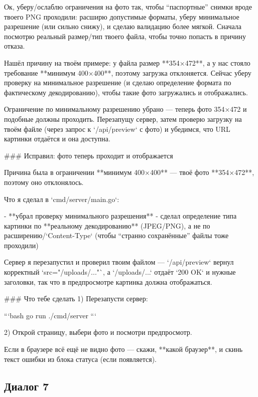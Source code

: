 \documentclass[a4paper, 14pt]{extarticle} %
\begin{document}
\begin{AnswerBlock}

Ок, уберу/ослаблю ограничения на фото так, чтобы “паспортные” снимки вроде твоего PNG проходили: расширю допустимые форматы, уберу минимальное разрешение (или сильно снижу), и сделаю валидацию более мягкой. Сначала посмотрю реальный размер/тип твоего файла, чтобы точно попасть в причину отказа.

Нашёл причину на твоём примере: у файла размер **354×472**, а у нас стояло требование **минимум 400×400**, поэтому загрузка отклоняется. Сейчас уберу проверку на минимальное разрешение (и сделаю определение формата по фактическому декодированию), чтобы такие фото загружались и отображались.

Ограничение по минимальному разрешению убрано — теперь фото 354×472 и подобные должны проходить. Перезапущу сервер, затем проверю загрузку на твоём файле (через запрос к `/api/preview` с фото) и убедимся, что URL картинки отдаётся и она доступна.

### Исправил: фото теперь проходит и отображается

Причина была в ограничении **минимум 400×400** — твоё фото **354×472**, поэтому оно отклонялось.

Что я сделал в `cmd/server/main.go`:

- **убрал проверку минимального разрешения**
- сделал определение типа картинки по **реальному декодированию** (JPEG/PNG), а не по расширению/`Content-Type` (чтобы “странно сохранённые” файлы тоже проходили)

Сервер я перезапустил и проверил твоим файлом — `/api/preview` вернул корректный `src="/uploads/..."`, а `/uploads/...` отдаёт `200 OK` и нужные заголовки, так что в предпросмотре картинка должна отображаться.

### Что тебе сделать
1) Перезапусти сервер:

```bash
go run ./cmd/server
```

2) Открой страницу, выбери фото и посмотри предпросмотр.

Если в браузере всё ещё не видно фото — скажи, **какой браузер**, и скинь текст ошибки из блока статуса (если появляется).

\end{AnswerBlock}

\subsection*{Диалог 7}
\end{document}
